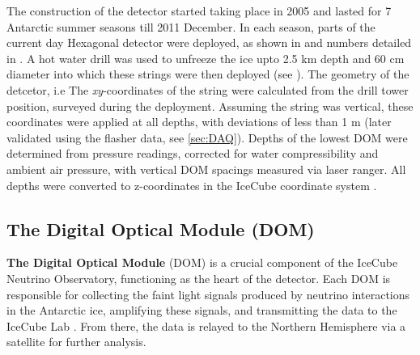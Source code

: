 The construction of the detector started taking place in 2005 and lasted for 7 Antarctic summer seasons till 2011 December. In each season, parts of the current day Hexagonal detector were deployed, as shown in  and numbers detailed in . A hot water drill was used to unfreeze the ice upto 2.5 km depth and 60 cm diameter into which these strings were then deployed (see ). The geometry of the detcetor, i.e The \emph{xy}-coordinates of the string were calculated from the drill tower position, surveyed during the deployment. Assuming the string was vertical, these coordinates were applied at all depths, with deviations of less than 1 m (later validated using the flasher data, see \ref{sec:DAQ}). Depths of the lowest DOM were determined from pressure readings, corrected for water compressibility and ambient air pressure, with vertical DOM spacings measured via laser ranger. All depths were converted to z-coordinates in the IceCube coordinate system .\par  


\subsection{The Digital Optical Module (DOM)}
\label{sec:dom}
\textbf{The Digital Optical Module} (DOM) is a crucial component of the IceCube Neutrino Observatory, functioning as the heart of the detector. Each DOM is responsible for collecting the faint light signals produced by neutrino interactions in the Antarctic ice, amplifying these signals, and transmitting the data to the IceCube Lab \cite{Aartsen_2017}. From there, the data is relayed to the Northern Hemisphere via a satellite for further analysis. 

